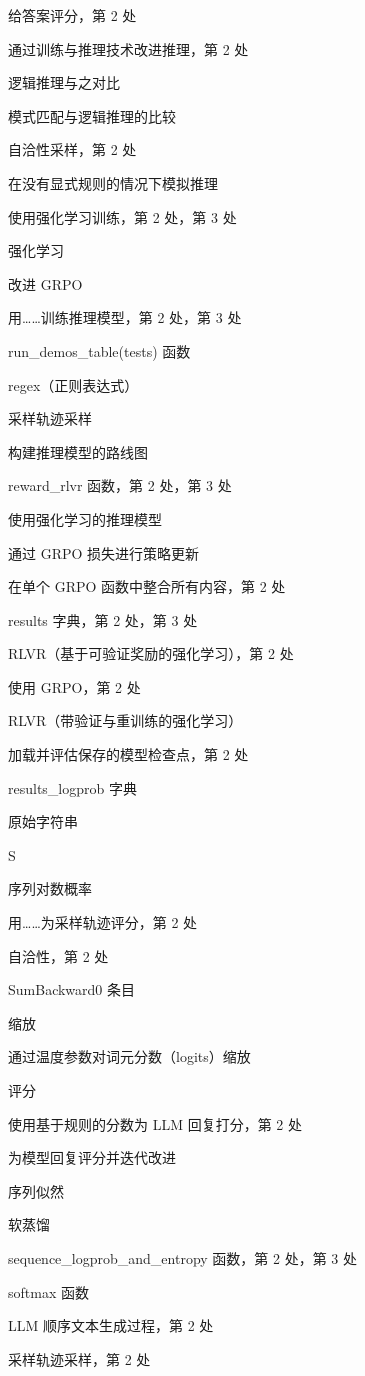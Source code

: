 给答案评分，第 2 处

通过训练与推理技术改进推理，第 2 处

逻辑推理与之对比

模式匹配与逻辑推理的比较

自洽性采样，第 2 处

在没有显式规则的情况下模拟推理

使用强化学习训练，第 2 处，第 3 处

强化学习

改进 GRPO

用……训练推理模型，第 2 处，第 3 处

run\_demos\_table(tests) 函数

regex（正则表达式）

采样轨迹采样

构建推理模型的路线图

reward\_rlvr 函数，第 2 处，第 3 处

使用强化学习的推理模型

通过 GRPO 损失进行策略更新

在单个 GRPO 函数中整合所有内容，第 2 处

results 字典，第 2 处，第 3 处

RLVR（基于可验证奖励的强化学习），第 2 处

使用 GRPO，第 2 处

RLVR（带验证与重训练的强化学习）

加载并评估保存的模型检查点，第 2 处

results\_logprob 字典

原始字符串

S

序列对数概率

用……为采样轨迹评分，第 2 处

自洽性，第 2 处

SumBackward0 条目

缩放

通过温度参数对词元分数（logits）缩放

评分

使用基于规则的分数为 LLM 回复打分，第 2 处

为模型回复评分并迭代改进

序列似然

软蒸馏

sequence\_logprob\_and\_entropy 函数，第 2 处，第 3 处

softmax 函数

LLM 顺序文本生成过程，第 2 处

采样轨迹采样，第 2 处

